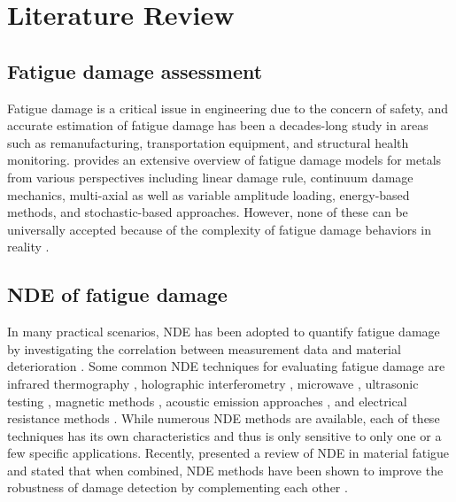 \chapter{Literature Review}
\label{chap: litrev}

\section{Fatigue damage assessment}
Fatigue damage is a critical issue in engineering due to the concern of safety, and accurate estimation of fatigue damage has been a decades-long study in areas such as remanufacturing, transportation equipment, and structural health monitoring.  provides an extensive overview of fatigue damage models for metals from various perspectives including linear damage rule, continuum damage mechanics, multi-axial as well as variable amplitude loading, energy-based methods, and stochastic-based approaches. However, none of these can be universally accepted because of the complexity of fatigue damage behaviors in reality \cite{fatigue-review-Santecchia2016}.

\section{NDE of fatigue damage}
In many practical scenarios, NDE has been adopted to quantify fatigue damage by investigating the correlation between measurement data and material deterioration \cite{nde-review-ACHENBACH200013}. Some common NDE techniques for evaluating fatigue damage are infrared thermography \cite{nde-thermo-FAN20121}, holographic interferometry \cite{nde-dic}, microwave \cite{nde-microwave}, ultrasonic testing \cite{nde-lu-fatigue-JOSHI1972577, nde-nlu-fatigue-NAGY1998375,nde-nlu-review-Matlack2014, nde-nlu-fatigue-Cantrell}, magnetic methods \cite{nde-magnetic}, acoustic emission approaches \cite{nde-ae-CHAI2017101}, and electrical resistance methods \cite{nde-electrical-resistance-SUN2007}. While numerous NDE methods are available, each of these techniques has its own characteristics and thus is only sensitive to only one or a few specific applications. Recently,  presented a review of NDE in material fatigue and stated that when combined, NDE methods have been shown to improve the robustness of damage detection by complementing each other \cite{nde-review-WISNER2020}.

